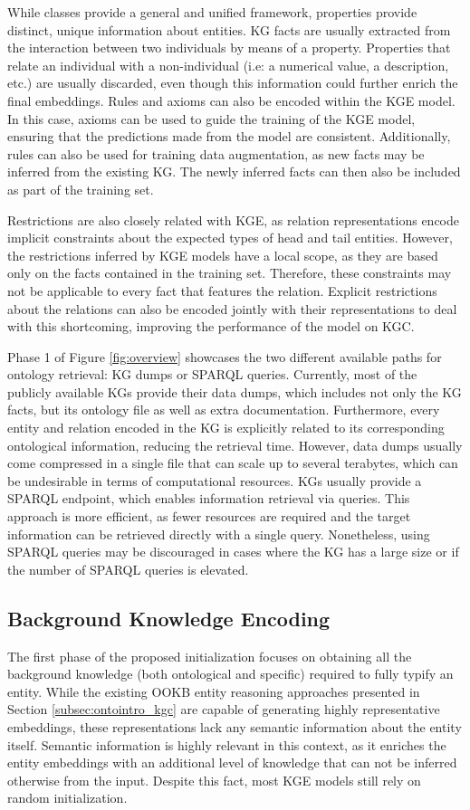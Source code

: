 While classes provide a general and unified framework, properties provide distinct, unique information about entities. KG facts are usually extracted from the interaction between two individuals by means of a property. Properties that relate an individual with a non-individual (i.e: a numerical value, a description, etc.) are usually discarded, even though this information could further enrich the final embeddings. Rules and axioms can also be encoded within the KGE model. In this case, axioms can be used to guide the training of the KGE model, ensuring that the predictions made from the model are consistent. Additionally, rules can also be used for training data augmentation, as new facts may be inferred from the existing KG. The newly inferred facts can then also be included as part of the training set.

Restrictions are also closely related with KGE, as relation representations encode implicit constraints about the expected types of head and tail entities. However, the restrictions inferred by KGE models have a local scope, as they are based only on the facts contained in the training set. Therefore, these constraints may not be applicable to every fact that features the relation. Explicit restrictions about the relations can also be encoded jointly with their representations to deal with this shortcoming, improving the performance of the model on KGC.

Phase 1 of Figure \ref{fig:overview} showcases the two different available paths for ontology retrieval: KG dumps or SPARQL queries. Currently, most of the publicly available KGs provide their data dumps, which includes not only the KG facts, but its ontology file as well as extra documentation. Furthermore, every entity and relation encoded in the KG is explicitly related to its corresponding ontological information, reducing the retrieval time. However, data dumps usually come compressed in a single file that can scale up to several terabytes, which can be undesirable in terms of computational resources. KGs usually provide a SPARQL endpoint, which enables information retrieval via queries. This approach is more efficient, as fewer resources are required and the target information can be retrieved directly with a single query. Nonetheless, using SPARQL queries may be discouraged in cases where the KG has a large size or if the number of SPARQL queries is elevated. 

\subsection{Background Knowledge Encoding}
The first phase of the proposed initialization focuses on obtaining all the background knowledge (both ontological and specific) required to fully typify an entity. While the existing OOKB entity reasoning approaches presented in Section \ref{subsec:ontointro_kgc} are capable of generating highly representative embeddings, these representations lack any semantic information about the entity itself. Semantic information is highly relevant in this context, as it enriches the entity embeddings with an additional level of knowledge that can not be inferred otherwise from the input. Despite this fact, most KGE models still rely on random initialization. 

